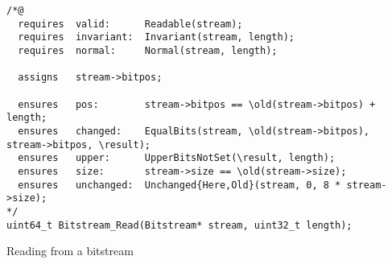 \begin{listing}[hbt]
\begin{minipage}{0.99\textwidth}
\begin{lstlisting}[style=acsl-block]
/*@
  requires  valid:      Readable(stream);
  requires  invariant:  Invariant(stream, length);
  requires  normal:     Normal(stream, length);

  assigns   stream->bitpos;

  ensures   pos:        stream->bitpos == \old(stream->bitpos) + length;
  ensures   changed:    EqualBits(stream, \old(stream->bitpos), stream->bitpos, \result);
  ensures   upper:      UpperBitsNotSet(\result, length);
  ensures   size:       stream->size == \old(stream->size);
  ensures   unchanged:  Unchanged{Here,Old}(stream, 0, 8 * stream->size);
*/
uint64_t Bitstream_Read(Bitstream* stream, uint32_t length);
\end{lstlisting}
\end{minipage}
\caption{\label{lst:Bitstream_Read spec}Reading from a bitstream}
\end{listing}





